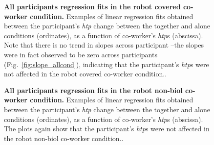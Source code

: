 \begin{figure}
	\caption{{\bf All participants regression fits in the robot covered co-worker condition.} Examples of linear regression fits obtained between the participant's {\it htp} change between the together and alone conditions (ordinates), as a function of co-worker's {\it htp}s (abscissa). Note that there is no trend in slopes across participant  --the slopes were in fact observed to be zero across participants (Fig.~\ref{fig:slope_allcond}), indicating that  the participant's {\it htp}s were not affected in the robot covered co-worker condition..}
\label{S3_Fig}
\end{figure}


\begin{figure}
	\caption{{\bf All participants regression fits in the robot non-biol co-worker condition.} Examples of linear regression fits obtained between the participant's {\it htp} change between the together and alone conditions (ordinates), as a function of co-worker's {\it htp}s (abscissa). The plots again show that the participant's {\it htp}s were not affected in the robot non-biol co-worker condition..}
\label{S5_Fig}
\end{figure}


